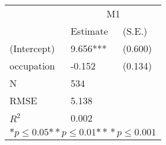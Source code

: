 \begin{tabular}{*{3}{l}}
\hline
                  & \multicolumn{2}{c}{M1}   \tabularnewline
                   &Estimate  &(S.E.)  \tabularnewline
 \hline
 \hline
   (Intercept)     &9.656***   &   (0.600) \tabularnewline
   occupation      &-0.152   &   (0.134) \tabularnewline
 \hline
 N                 &534       &        \tabularnewline
 RMSE             &5.138         & \tabularnewline
 $R^2$             &0.002         & \tabularnewline
 \hline
\hline
 
 \multicolumn{3}{c}{${*  p}\le 0.05$${*\!\!*  p}\le 0.01$${*\!\!*\!\!*  p}\le 0.001$}\tabularnewline
 \end{tabular}